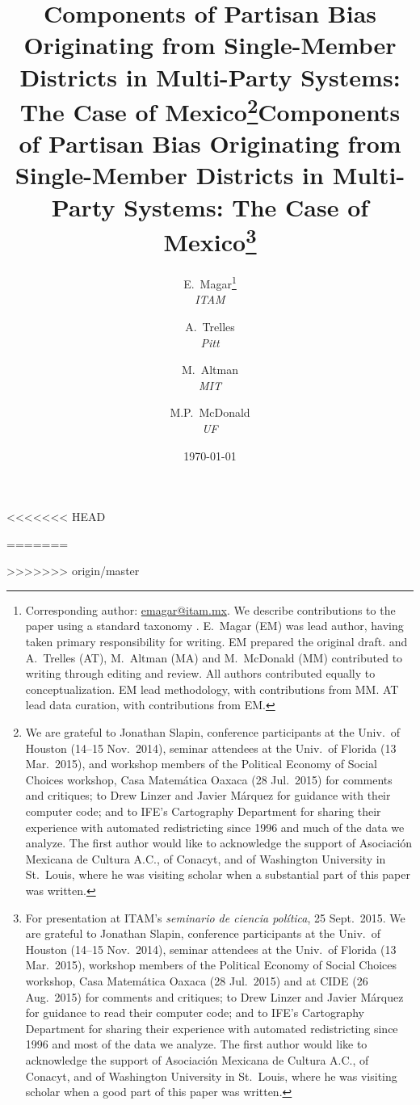 \documentclass[letter,12pt]{article}
\begin{document}
<<<<<<< HEAD
\title{Components of Partisan Bias Originating from Single-Member Districts in Multi-Party Systems: The Case of Mexico\thanks{We are grateful to Jonathan Slapin, conference participants at the Univ.\ of Houston (14--15 Nov.\ 2014), seminar attendees at the Univ.\ of Florida (13 Mar.\ 2015), and workshop members of the Political Economy of Social Choices workshop, Casa Matem\'atica Oaxaca (28 Jul.\ 2015) for comments and critiques; to Drew Linzer and Javier M\'arquez for guidance with their computer code; and to IFE's Cartography Department for sharing their experience with automated redistricting since 1996 and much of the data we analyze. The first author would like to acknowledge the support of Asociaci\'on Mexicana de Cultura A.C., of Conacyt, and of Washington University in St.\ Louis, where he was visiting scholar when a substantial part of this paper was written.}}
=======
\title{Components of Partisan Bias Originating from Single-Member Districts in Multi-Party Systems: The Case of Mexico\thanks{For presentation at ITAM's \emph{seminario de ciencia pol\'itica}, 25 Sept.\ 2015. We are grateful to Jonathan Slapin, conference participants at the Univ.\ of Houston (14--15 Nov.\ 2014), seminar attendees at the Univ.\ of Florida (13 Mar.\ 2015), workshop members of the Political Economy of Social Choices workshop, Casa Matem\'atica Oaxaca (28 Jul.\ 2015) and at CIDE (26 Aug.\ 2015) for comments and critiques; to Drew Linzer and Javier M\'arquez for guidance to read their computer code; and to IFE's Cartography Department for sharing their experience with automated redistricting since 1996 and most of the data we analyze. The first author would like to acknowledge the support of Asociaci\'on Mexicana de Cultura A.C., of Conacyt, and of Washington University in St.\ Louis, where he was visiting scholar when a good part of this paper was written.}}

>>>>>>> origin/master
\author{E.~Magar\footnote{Corresponding author: \url{emagar@itam.mx}.  We describe contributions to the paper using a standard taxonomy \citep{allen2014credit}. E.~Magar (EM) was lead author, having taken primary responsibility for writing. EM prepared the original draft. and A.~Trelles (AT), M.~Altman (MA) and M.~McDonald (MM) contributed to writing through editing and review. All authors contributed equally to conceptualization. EM lead methodology, with contributions from MM. AT lead data curation, with contributions from EM.} \\ \emph{ITAM} \and
        A.~Trelles \\ \emph{Pitt} \and  
        M.~Altman \\ \emph{MIT} \and
        M.P.~McDonald \\ \emph{UF}
      }
\date{\today}
\maketitle
\end{document}
